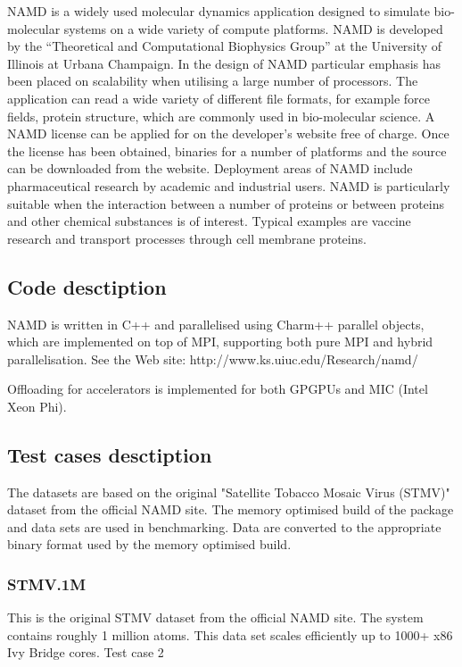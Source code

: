 NAMD is a widely used molecular dynamics application designed to simulate bio-molecular systems on a wide variety of compute platforms. NAMD is developed by the “Theoretical and Computational Biophysics Group” at the University of Illinois at Urbana Champaign. In the design of NAMD particular emphasis has been placed on scalability when utilising a large number of processors. The application can read a wide variety of different file formats, for example force fields, protein structure, which are commonly used in bio-molecular science. A NAMD license can be applied for on the developer’s website free of charge. Once the license has been obtained, binaries for a number of platforms and the source can be downloaded from the website. Deployment areas of NAMD include pharmaceutical research by academic and industrial users. NAMD is particularly suitable when the interaction between a number of proteins or between proteins and other chemical substances is of interest. Typical examples are vaccine research and transport processes through cell membrane proteins.

\subsection{Code desctiption}
NAMD is written in C++ and parallelised using Charm++ parallel objects, which are implemented on top of MPI, supporting both pure MPI and hybrid parallelisation.
See the Web site: http://www.ks.uiuc.edu/Research/namd/

Offloading for accelerators is implemented for both GPGPUs and MIC (Intel Xeon Phi).

\subsection{Test cases desctiption}
The datasets are based on the original "Satellite Tobacco Mosaic Virus (STMV)" dataset from the official NAMD site. The memory optimised build of the package and data sets are used in benchmarking. Data are converted to the appropriate binary format used by the memory optimised build.

\subsubsection{STMV.1M}
This is the original STMV dataset from the official NAMD site. The system contains roughly 1 million atoms. This data set scales efficiently up to 1000+ x86 Ivy Bridge cores.
Test case 2


